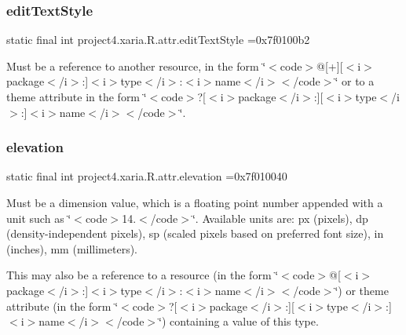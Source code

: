 \subsubsection{\texorpdfstring{edit\+Text\+Style}{editTextStyle}}
{\footnotesize\ttfamily static final int project4.\+xaria.\+R.\+attr.\+edit\+Text\+Style =0x7f0100b2\hspace{0.3cm}{\ttfamily [static]}}

Must be a reference to another resource, in the form \char`\"{}$<$code$>$@\mbox{[}+\mbox{]}\mbox{[}$<$i$>$package$<$/i$>$\+:\mbox{]}$<$i$>$type$<$/i$>$\+:$<$i$>$name$<$/i$>$$<$/code$>$\char`\"{} or to a theme attribute in the form \char`\"{}$<$code$>$?\mbox{[}$<$i$>$package$<$/i$>$\+:\mbox{]}\mbox{[}$<$i$>$type$<$/i$>$\+:\mbox{]}$<$i$>$name$<$/i$>$$<$/code$>$\char`\"{}. \mbox{\label{classproject4_1_1xaria_1_1R_1_1attr_a9b73be576782af619051dcac6ba7c7cc}} 
\subsubsection{\texorpdfstring{elevation}{elevation}}
{\footnotesize\ttfamily static final int project4.\+xaria.\+R.\+attr.\+elevation =0x7f010040\hspace{0.3cm}{\ttfamily [static]}}

Must be a dimension value, which is a floating point number appended with a unit such as \char`\"{}$<$code$>$14.\+5sp$<$/code$>$\char`\"{}. Available units are\+: px (pixels), dp (density-\/independent pixels), sp (scaled pixels based on preferred font size), in (inches), mm (millimeters). 

This may also be a reference to a resource (in the form \char`\"{}$<$code$>$@\mbox{[}$<$i$>$package$<$/i$>$\+:\mbox{]}$<$i$>$type$<$/i$>$\+:$<$i$>$name$<$/i$>$$<$/code$>$\char`\"{}) or theme attribute (in the form \char`\"{}$<$code$>$?\mbox{[}$<$i$>$package$<$/i$>$\+:\mbox{]}\mbox{[}$<$i$>$type$<$/i$>$\+:\mbox{]}$<$i$>$name$<$/i$>$$<$/code$>$\char`\"{}) containing a value of this type. \mbox{\label{classproject4_1_1xaria_1_1R_1_1attr_a6882a022a9acc52f7d2350974ef53dbf}} 
